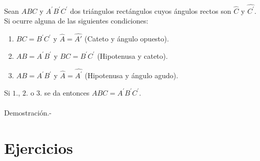     \begin{teo}
	Sean $ABC$ y $A^{'}B^{'}C^{'}$  dos triángulos rectángulos cuyos ángulos rectos son $\widehat{C}$ y $\widehat{C^{'}}$. Si ocurre alguna de las siguientes condiciones:
	\begin{enumerate}[\bfseries 1.]
	    \item $BC=B^{'}C^{'}$ y $\widehat{A}=\widehat{A{'}}$ (Cateto y ángulo opuesto).
	    \item $AB=A^{'}B^{'}$ y $BC=B^{'}C^{'}$ (Hipotenusa y cateto).
	    \item $AB=A^{'}B^{'}$ y $\widehat{A}=\widehat{A^{'}}$ (Hipotenusa y ángulo agudo).
	\end{enumerate}
	Si $1.$, $2.$ o $3.$ se da entonces $ABC=A^{'}B^{'}C^{'}$.\\\\
	    Demostración.-\;
    \end{teo}

\section{Ejercicios}

